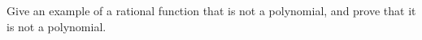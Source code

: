 Give an example of a rational function that is not a polynomial, and prove that it is not a polynomial.
